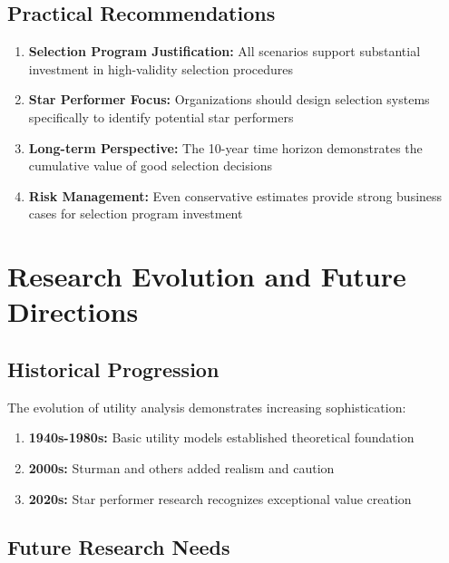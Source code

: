 \documentclass[
]{article}
\providecommand{\tightlist}{%
  \setlength{\itemsep}{0pt}\setlength{\parskip}{0pt}}
\begin{document}
\subsection{Practical Recommendations}\label{practical-recommendations}

\begin{enumerate}
\def\labelenumi{\arabic{enumi}.}
\item
  \textbf{Selection Program Justification:} All scenarios support
  substantial investment in high-validity selection procedures
\item
  \textbf{Star Performer Focus:} Organizations should design selection
  systems specifically to identify potential star performers
\item
  \textbf{Long-term Perspective:} The 10-year time horizon demonstrates
  the cumulative value of good selection decisions
\item
  \textbf{Risk Management:} Even conservative estimates provide strong
  business cases for selection program investment
\end{enumerate}

\section{Research Evolution and Future
Directions}\label{research-evolution-and-future-directions}

\subsection{Historical Progression}\label{historical-progression}

The evolution of utility analysis demonstrates increasing
sophistication:

\begin{enumerate}
\def\labelenumi{\arabic{enumi}.}
\tightlist
\item
  \textbf{1940s-1980s:} Basic utility models established theoretical
  foundation
\item
  \textbf{2000s:} Sturman and others added realism and caution
\item
  \textbf{2020s:} Star performer research recognizes exceptional value
  creation
\end{enumerate}

\subsection{Future Research Needs}\label{future-research-needs}
\end{document}

